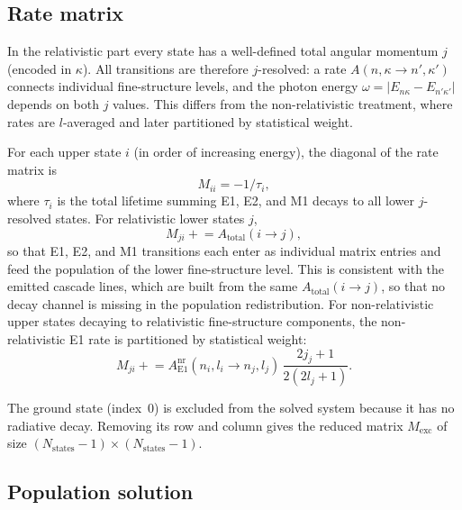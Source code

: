 \documentclass[11pt,a4paper]{article}
\newcommand{\E}{\mathrm{E}}
\newcommand{\nr}{\mathrm{nr}}
\begin{document}
\subsection{Rate matrix}
\label{sec:ratematrix}

In the relativistic part every state has a well-defined total angular
momentum $j$ (encoded in $\kappa$).  All transitions are therefore
$j$-resolved: a rate $A(n,\kappa\to n',\kappa')$ connects individual
fine-structure levels, and the photon energy
$\omega = |E_{n\kappa} - E_{n'\kappa'}|$ depends on both $j$ values.
This differs from the non-relativistic treatment, where rates are
$l$-averaged and later partitioned by statistical weight.

For each upper state $i$ (in order of increasing energy), the diagonal of the
rate matrix is
\[
M_{ii} = -1/\tau_{i},
\]
where $\tau_{i}$ is the total lifetime summing E1, E2, and M1 decays to
all lower $j$-resolved states.
For relativistic lower states $j$,
\[
M_{ji} \mathrel{+}= A_{\text{total}}(i\to j),
\]
so that E1, E2, and M1 transitions each enter as individual matrix
entries and feed the population of the lower fine-structure level.
This is consistent with the emitted cascade lines, which are built from
the same $A_{\text{total}}(i\to j)$, so that no decay channel is
missing in the population redistribution.
For non-relativistic upper states decaying to relativistic fine-structure
components, the non-relativistic E1 rate is partitioned by statistical weight:
\[
M_{ji} \mathrel{+}= A_{\E1}^{\nr}(n_{i},l_{i}\to n_{j},l_{j})\,
\frac{2j_{j}+1}{2(2l_{j}+1)}.
\]

The ground state (index~0) is excluded from the solved system because it has
no radiative decay.  Removing its row and column gives the reduced matrix
$M_{\mathrm{exc}}$ of size $(N_{\mathrm{states}}-1)\times(N_{\mathrm{states}}-1)$.

\subsection{Population solution}
\label{sec:cascade-population}
\end{document}
